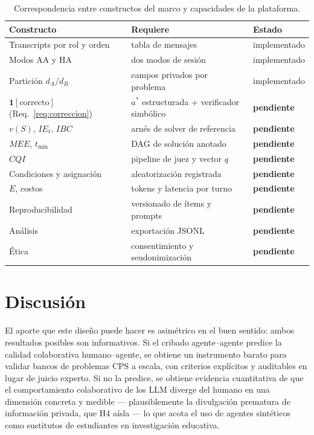 \documentclass[11pt,a4paper]{article}
\theoremstyle{definition}
\theoremstyle{plain}
\theoremstyle{remark}
\newcommand{\ind}[1]{\mathbf{1}\!\left[#1\right]}
\begin{document}
\begin{table}[t]
\centering
\small
\begin{tabular}{@{}lll@{}}
\toprule
\textbf{Constructo} & \textbf{Requiere} & \textbf{Estado} \\
\midrule
Transcripts por rol y orden        & tabla de mensajes                  & implementado \\
Modos AA y HA                      & dos modos de sesión                & implementado \\
Partición $d_A/d_B$                & campos privados por problema       & implementado \\
$\ind{\text{correcto}}$ (Req.~\ref{req:correccion}) & $a^\ast$ estructurada + verificador simbólico & \textbf{pendiente} \\
$v(S)$, $IE_t$, $IBC$              & arnés de solver de referencia      & \textbf{pendiente} \\
$MEE$, $t_{\min}$                  & DAG de solución anotado            & \textbf{pendiente} \\
$CQI$                              & pipeline de juez y vector $q$      & \textbf{pendiente} \\
Condiciones y asignación           & aleatorización registrada          & \textbf{pendiente} \\
$E$, costos                        & tokens y latencia por turno        & \textbf{pendiente} \\
Reproducibilidad                   & versionado de ítems y prompts      & \textbf{pendiente} \\
Análisis                           & exportación JSONL                  & \textbf{pendiente} \\
Ética                              & consentimiento y seudonimización   & \textbf{pendiente} \\
\bottomrule
\end{tabular}
\caption{Correspondencia entre constructos del marco y capacidades de la
plataforma.}
\label{tab:brecha}
\end{table}

\section{Discusión}

El aporte que este diseño puede hacer es asimétrico en el buen sentido: ambos
resultados posibles son informativos. Si el cribado agente--agente predice la
calidad colaborativa humano--agente, se obtiene un instrumento barato para validar
bancos de problemas CPS a escala, con criterios explícitos y auditables en lugar
de juicio experto. Si no la predice, se obtiene evidencia cuantitativa de que el
comportamiento colaborativo de los LLM diverge del humano en una dimensión
concreta y medible --- plausiblemente la divulgación prematura de información
privada, que H4 aísla --- lo que acota el uso de agentes sintéticos como
sustitutos de estudiantes en investigación educativa.
\end{document}

